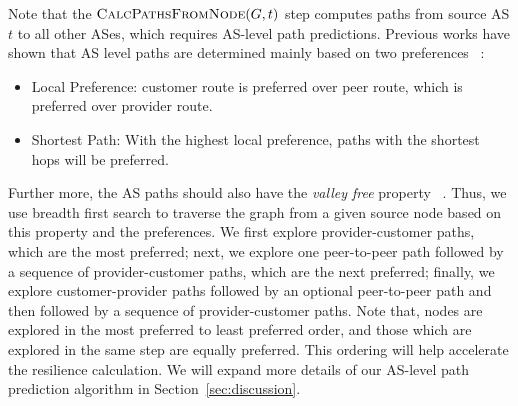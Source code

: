 Note that the $\Call{CalcPathsFromNode}{G,t}$ step computes paths from source AS $t$ to all other ASes, which requires AS-level path predictions. Previous works have shown that AS level paths are determined mainly based on two preferences ~\cite{gao2001stable}:

\begin{itemize}
\item Local Preference: customer route is preferred over peer route, which is preferred over provider route. 
\item Shortest Path: With the highest local preference, paths with the shortest hops will be preferred. 
\end{itemize}

Further more, the AS paths should also have the \emph{valley free} property ~\cite{gao2001inferring}. Thus, we use breadth first search to traverse the graph from a given source node based on this property and the preferences. We first explore provider-customer paths, which are the most preferred; next, we explore one peer-to-peer path followed by a sequence of provider-customer paths, which are the next preferred; finally, we explore customer-provider paths followed by an optional peer-to-peer path and then followed by a sequence of provider-customer paths. Note that, nodes are explored in the most preferred to least preferred order, and those which are explored in the same step are equally preferred. This ordering will help accelerate the resilience calculation. We will expand more details of our AS-level path prediction algorithm in Section~\ref{sec:discussion}. 



